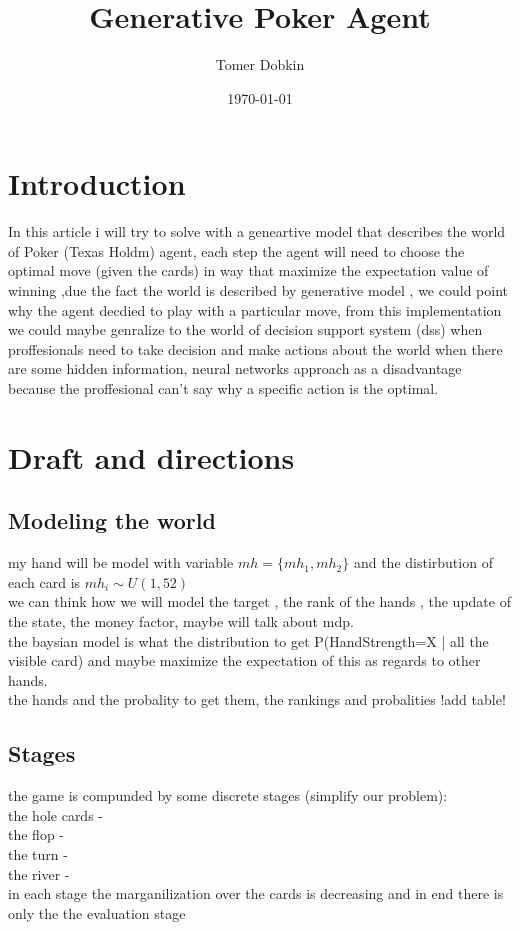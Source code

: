 \documentclass{article}
\title{Generative Poker Agent}
\author{Tomer Dobkin}
\date{\today}
\begin{document}
\maketitle
\section{Introduction}
 In this article i will try to solve with a geneartive model that describes the world of Poker (Texas Holdm)  agent, each step the agent will need to choose the optimal move (given the cards) in way that maximize the expectation value of winning  ,due the fact the world is described by generative model , we could point why the agent decdied to play with a particular move, from this implementation we could maybe genralize to the world of decision support system (dss) when proffesionals need to take decision and make actions about the world when there are some hidden information, neural networks approach as a disadvantage because the proffesional can't say why a specific action is the optimal.
\section{Draft and directions}
\subsection{Modeling the world}
my hand will be model with variable $mh=\{mh_1 , mh_2\}$ and the distirbution of each card is $mh_i \sim U(1,52)$\\
we can think how we will model the target , the rank of the hands , the update of the state, the money factor, maybe will talk about mdp.\\
the baysian model is what the distribution to get P(HandStrength=X | all the visible card) and maybe maximize the expectation of this as regards to other hands.\\
the hands and the probality to get them, the rankings and probalities !add table!

\subsection{Stages}
the game is compunded by some discrete stages (simplify our problem):\\
the hole cards - \\
the flop - \\
the turn - \\
the river - \\
in each stage the marganilization over the cards is decreasing and in end there is only the the evaluation stage
\end{document}
